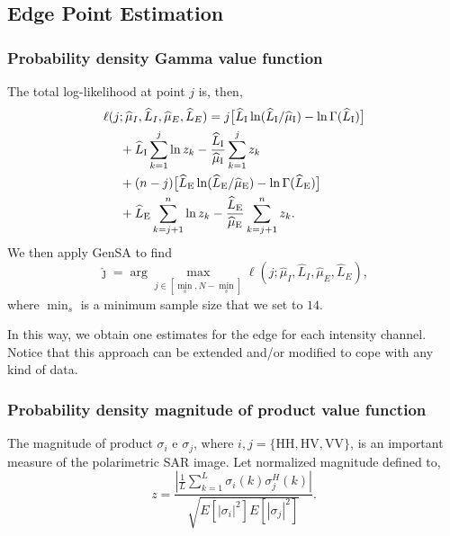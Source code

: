 \documentclass[journal]{IEEEtran}
\begin{document}
\subsection{Edge Point Estimation}
\subsubsection{Probability density Gamma value function}
The total log-likelihood at point $j$ is, then,
\begin{equation}\label{eq:TotalLogLikelihood}
\begin{split}
\ell(j&;\widehat{\mu}_I, \widehat{L}_I,\widehat{\mu}_E, \widehat{L}_E)= j \big[\widehat{L}_\text{I}\ln (\widehat{L}_\text{I} / \widehat{\mu}_\text{I})- \ln \Gamma(\widehat{L}_\text{I})\big]\\
             &+\widehat{L}_\text{I} \sum_{k=1}^{j}\ln z_k -\frac{\widehat{L}_\text{I}}{\widehat{\mu}_\text{I}}\sum_{k=1}^{j} z_k\\
             & + (n-j) \big[\widehat{L}_\text{E}\ln (\widehat{L}_\text{E} / \widehat{\mu}_\text{E}) - \ln \Gamma(\widehat{L}_\text{E})\big]\\
             &+\widehat{L}_\text{E} \sum_{k=j+1}^{n}\ln z_k -\frac{\widehat{L}_\text{E}}{\widehat{\mu}_\text{E}}\sum_{k=j+1}^{n} z_k.
\raisetag{2.2em}
\end{split}
\end{equation}
We then apply GenSA to find  
$$
\widehat{\jmath}= \arg\max\limits_{j\in [\min_s,N-\min_s]}\ell(j;\widehat{\mu}_I, \widehat{L}_I,\widehat{\mu}_E, \widehat{L}_E),
$$ 
where $\min_s$ is a minimum sample size that we set to $14$.

In this way, we obtain one estimates for the edge for each intensity channel.
Notice that this approach can be extended and/or modified to cope with any kind of data.


\subsubsection{Probability density magnitude of product value function}

The magnitude of product $\sigma_i$ e $\sigma_j$, where $i,j=\{\text{HH},\text{HV}, \text{VV}\}$, is an important measure of the polarimetric SAR image. Let normalized magnitude defined to, 
\begin{equation}
	z = \frac{\left|\frac{1}{L} \sum_{k=1}^L\sigma_i(k)\sigma_j^H(k) \right|}{\sqrt{E[|\sigma_i|^2]E[|\sigma_j|^2]}}.
\end{equation}
\end{document}
